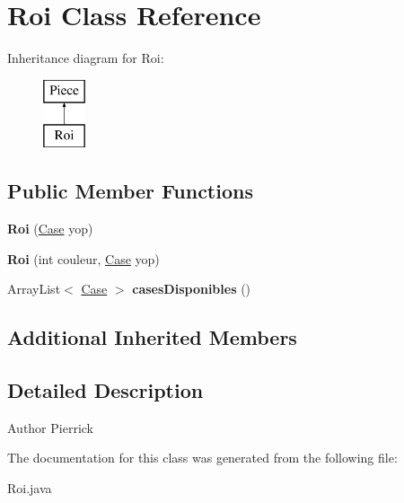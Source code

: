 \hypertarget{class_roi}{}\section{Roi Class Reference}
\label{class_roi}
Inheritance diagram for Roi\+:\begin{figure}[H]
\begin{center}
\leavevmode
\includegraphics[height=2.000000cm]{class_roi}
\end{center}
\end{figure}
\subsection*{Public Member Functions}
\begin{DoxyCompactItemize}
\item 
{\bfseries Roi} (\hyperlink{class_case}{Case} yop)\hypertarget{class_roi_ae7848604f3ded0e548d4cc8174f124a7}{}\label{class_roi_ae7848604f3ded0e548d4cc8174f124a7}

\item 
{\bfseries Roi} (int couleur, \hyperlink{class_case}{Case} yop)\hypertarget{class_roi_a80ff4d51c676a846d0677e39d03b1dd7}{}\label{class_roi_a80ff4d51c676a846d0677e39d03b1dd7}

\item 
Array\+List$<$ \hyperlink{class_case}{Case} $>$ {\bfseries cases\+Disponibles} ()\hypertarget{class_roi_a8f5a395fb7c80f412e09de18ee52043b}{}\label{class_roi_a8f5a395fb7c80f412e09de18ee52043b}

\end{DoxyCompactItemize}
\subsection*{Additional Inherited Members}


\subsection{Detailed Description}
\begin{DoxyAuthor}{Author}
Pierrick 
\end{DoxyAuthor}


The documentation for this class was generated from the following file\+:\begin{DoxyCompactItemize}
\item 
Roi.\+java\end{DoxyCompactItemize}
